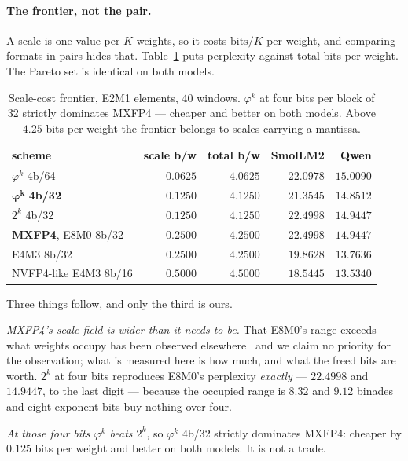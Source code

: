 \documentclass[11pt]{article}
\theoremstyle{definition}
\begin{document}
\paragraph{The frontier, not the pair.} A scale is one value per $K$ weights,
so it costs $\mathrm{bits}/K$ per weight, and comparing formats in pairs hides
that. Table~\ref{tab:frontier} puts perplexity against total bits per weight.
The Pareto set is identical on both models.

\begin{table}[t]\centering
\caption{Scale-cost frontier, E2M1 elements, 40 windows. $\varphi^{k}$ at four
bits per block of 32 strictly dominates MXFP4 --- cheaper and better on both
models. Above $4.25$ bits per weight the frontier belongs to scales carrying a
mantissa.}
\label{tab:frontier}
\begin{tabular}{lrrrr}
\toprule
scheme & scale b/w & total b/w & SmolLM2 & Qwen \\
\midrule
$\varphi^{k}$ 4b/64        & $0.0625$ & $4.0625$ & $22.0978$ & $15.0090$ \\
$\boldsymbol{\varphi^{k}}$ \textbf{4b/32} & $\mathbf{0.1250}$ & $\mathbf{4.1250}$ & $\mathbf{21.3545}$ & $\mathbf{14.8512}$ \\
$2^{k}$ 4b/32              & $0.1250$ & $4.1250$ & $22.4998$ & $14.9447$ \\
\textbf{MXFP4}, E8M0 8b/32 & $0.2500$ & $4.2500$ & $22.4998$ & $14.9447$ \\
E4M3 8b/32                 & $0.2500$ & $4.2500$ & $19.8628$ & $13.7636$ \\
NVFP4-like E4M3 8b/16      & $0.5000$ & $4.5000$ & $18.5445$ & $13.5340$ \\
\bottomrule
\end{tabular}
\end{table}

Three things follow, and only the third is ours.

\emph{MXFP4's scale field is wider than it needs to be.} That E8M0's range
exceeds what weights occupy has been observed elsewhere~\cite{mxgap} and we
claim no priority for the observation; what is measured here is how much, and
what the freed bits are worth. $2^{k}$ at four bits reproduces E8M0's perplexity
\emph{exactly} --- $22.4998$ and
$14.9447$, to the last digit --- because the occupied range is $8.32$ and
$9.12$ binades and eight exponent bits buy nothing over four.

\emph{At those four bits $\varphi^{k}$ beats $2^{k}$}, so $\varphi^{k}$ 4b/32
strictly dominates MXFP4: cheaper by $0.125$ bits per weight and better on both
models. It is not a trade.
\end{document}
